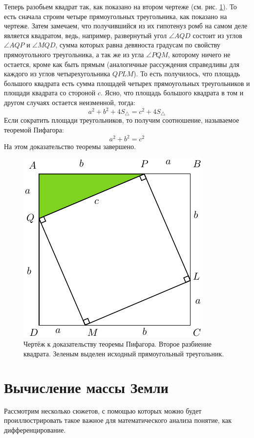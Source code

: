 \documentclass[a4paper,9pt,russian]{article}
\begin{document}
\par
Теперь разобьем квадрат так, как показано на втором чертеже (см. рис. \ref{fig:32}). То есть сначала строим четыре прямоугольных треугольника, как показано на чертеже. Затем замечаем, что получившийся из их гипотенуз ромб на самом деле является квадратом, ведь, например, развернутый угол $\angle AQD$ состоит из углов $\angle AQP$ и $\angle MQD$, сумма которых равна девяноста градусам по свойству прямоугольного треугольника, а так же из угла $\angle PQM$, которому ничего не остается, кроме как быть прямым (аналогичные рассуждения справедливы для каждого из углов четырехугольника $QPLM$). То есть получилось, что площадь большого квадрата есть сумма площадей четырех прямоугольных треугольников и площади квадрата со стороной $c$. Ясно, что площадь большого квадрата в том и другом случаях остается неизменной, тогда:
\begin{equation}
 a^2 + b^2 + 4S_\triangle=c^2+4S_\triangle
\end{equation}
Если сократить площади треугольников, то получим соотношение, называемое теоремой Пифагора:
\begin{equation}
 a^2 + b^2 =c^2
\end{equation}
На этом доказательство теоремы завершено.
\begin{figure}[ht]
	\centering
	\includegraphics[scale = 1]{first22.pdf}
	\caption{Чертёж к доказательству теоремы Пифагора. Второе разбиение квадрата. Зеленым выделен исходный прямоугольный треугольник.}
	\label{fig:32}
\end{figure}
\section{Вычисление массы Земли}
Рассмотрим несколько сюжетов, с помощью которых можно будет проиллюстрировать такое важное для математического анализа понятие, как дифференцирование. 
\end{document}
